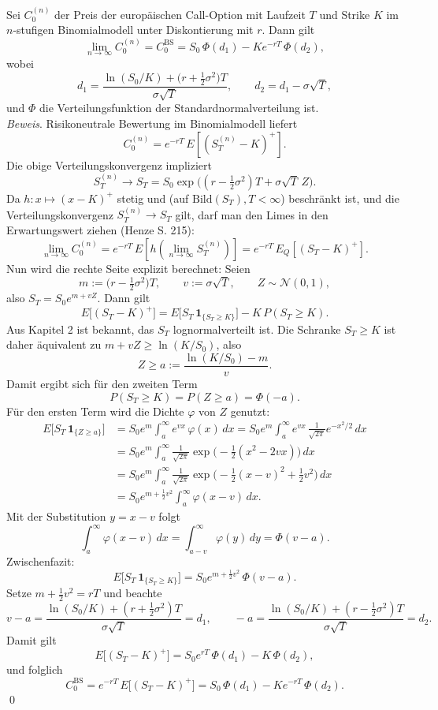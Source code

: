 \begin{satz}
Sei $C_0^{(n)}$ der Preis der europäischen Call-Option mit Laufzeit $T$ und Strike $K$
im $n$-stufigen Binomialmodell unter Diskontierung mit $r$. Dann gilt
$$
\lim_{n\to\infty} C_0^{(n)}
= C_0^{\mathrm{BS}}
= S_0\,\Phi(d_1) - K e^{-rT}\,\Phi(d_2),
$$
wobei
$$
d_1 = \frac{\ln(S_0/K) + \big(r + \tfrac12 \sigma^2\big)T}{\sigma \sqrt{T}},
\qquad
d_2 = d_1 - \sigma \sqrt{T},
$$
und $\Phi$ die Verteilungsfunktion der Standardnormalverteilung ist.
\\ \textit{Beweis}. Risikoneutrale Bewertung im Binomialmodell liefert
$$
C_0^{(n)} = e^{-rT}\,E\!\left[(S_T^{(n)} - K)^+\right].
$$
Die obige Verteilungskonvergenz impliziert
$$
S_T^{(n)} \longrightarrow S_T = S_0 \exp\!\big((r-\tfrac12\sigma^2)T + \sigma \sqrt{T}\,Z\big).
$$
Da $h : x\mapsto (x-K)^+$ stetig und (auf $\text{Bild}(S_T), T \lt \infty$) beschränkt ist, und die Verteilungskonvergenz $S_T^{(n)}\longrightarrow S_T$ gilt,
darf man den Limes in den Erwartungswert ziehen (Henze S. 215):
$$
\lim_{n\to\infty} C_0^{(n)} = e^{-rT}\,E\!\left[ h(\lim_{n\to\infty} S_T^{(n)}) \right] = e^{-rT}\,E_Q\!\left[(S_T - K)^+\right].
$$
Nun wird die rechte Seite explizit berechnet: Seien
$$
m := \big(r-\tfrac12\sigma^2\big)T,\qquad v:=\sigma \sqrt{T},\qquad Z\sim \mathcal N(0,1),
$$
also $S_T = S_0 e^{m + v Z}$. Dann gilt
$$
E\big[(S_T - K)^+\big]
= E\big[S_T\,\mathbf 1_{\{S_T\ge K\}}\big] - K\,P(S_T\ge K).
$$
Aus Kapitel 2 ist bekannt, das $S_T$ lognormalverteilt ist. Die Schranke $S_T\ge K$ ist daher äquivalent zu $m + vZ \ge \ln(K/S_0)$, also
$$
Z \ge a := \frac{\ln(K/S_0) - m}{v}.
$$
Damit ergibt sich für den zweiten Term
$$
P(S_T\ge K) = P(Z\ge a) = \Phi(-a).
$$
Für den ersten Term wird die Dichte $\varphi$ von $Z$ genutzt:
$$
\begin{aligned}
E\big[S_T\,\mathbf 1_{\{Z\ge a\}}\big]
&= S_0 e^{m}\int_a^\infty e^{v x}\,\varphi(x)\,dx
= S_0 e^{m}\int_a^\infty e^{v x}\,\frac{1}{\sqrt{2\pi}}e^{-x^2/2}\,dx \\
&= S_0 e^{m}\int_a^\infty \frac{1}{\sqrt{2\pi}}
\exp\!\Big(-\tfrac12(x^2 - 2 v x)\Big)\,dx \\
&= S_0 e^{m}\int_a^\infty \frac{1}{\sqrt{2\pi}}
\exp\!\Big(-\tfrac12(x - v)^2 + \tfrac12 v^2\Big)\,dx \\
&= S_0 e^{m + \frac12 v^2}\int_a^\infty \varphi(x - v)\,dx.
\end{aligned}
$$
Mit der Substitution $y=x-v$ folgt
$$
\int_a^\infty \varphi(x - v)\,dx = \int_{a-v}^\infty \varphi(y)\,dy = \Phi(v-a).
$$
Zwischenfazit:
$$
E\big[S_T\,\mathbf 1_{\{S_T\ge K\}}\big]
= S_0 e^{m + \frac12 v^2}\,\Phi(v-a).
$$
Setze $m+\tfrac12 v^2 = rT$ und beachte
$$
v-a = \frac{\ln(S_0/K) + (r+\tfrac12\sigma^2)T}{\sigma \sqrt{T}} = d_1,
\qquad
-a = \frac{\ln(S_0/K) + (r-\tfrac12\sigma^2)T}{\sigma \sqrt{T}} = d_2.
$$
Damit gilt
$$
E\big[(S_T - K)^+\big]
= S_0 e^{rT}\,\Phi(d_1) - K\,\Phi(d_2),
$$
und folglich
$$
C_0^{\mathrm{BS}} = e^{-rT}\,E\big[(S_T - K)^+\big]
= S_0\,\Phi(d_1) - K e^{-rT}\,\Phi(d_2).
$$
\qed
\end{satz}

